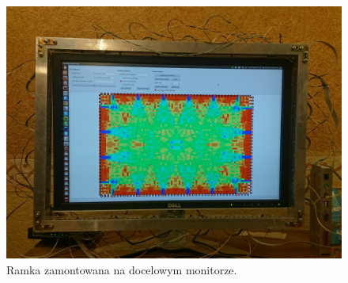 \begin{figure}
  \myfloatalign
  \vspace{0.1\textheight}
  \includegraphics[width=\textwidth]{gfx/frame_full}
  \caption{Ramka zamontowana na docelowym monitorze.}
  \label{fig:frame_full}
\end{figure}
